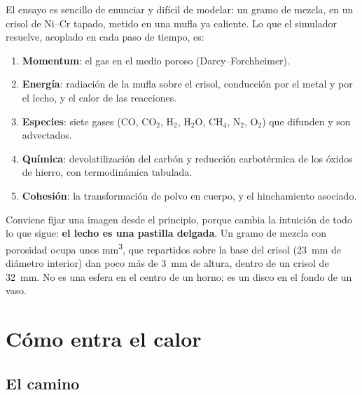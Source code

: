 \documentclass[11pt,a4paper]{article}
\begin{document}
El ensayo es sencillo de enunciar y difícil de modelar: un gramo de mezcla, en
un crisol de Ni--Cr tapado, metido en una mufla ya caliente. Lo que el
simulador resuelve, acoplado en cada paso de tiempo, es:

\begin{enumerate}[nosep,leftmargin=*]
  \item \textbf{Momentum}: el gas en el medio poroso (Darcy--Forchheimer).
  \item \textbf{Energía}: radiación de la mufla sobre el crisol, conducción por
        el metal y por el lecho, y el calor de las reacciones.
  \item \textbf{Especies}: siete gases (CO, CO$_2$, H$_2$, H$_2$O, CH$_4$,
        N$_2$, O$_2$) que difunden y son advectados.
  \item \textbf{Química}: devolatilización del carbón y reducción carbotérmica
        de los óxidos de hierro, con termodinámica tabulada.
  \item \textbf{Cohesión}: la transformación de polvo en cuerpo, y el
        hinchamiento asociado.
\end{enumerate}

\begin{table}[H]\centering\small
\caption{Parámetros de la corrida. La geometría y la carga son las del ensayo;
el resto son los valores del caso \texttt{carbon\_magnetita.yaml}.}

\end{table}

\noindent
Conviene fijar una imagen desde el principio, porque cambia la intuición de
todo lo que sigue: \textbf{el lecho es una pastilla delgada}. Un gramo de mezcla
con porosidad \datEpsInicial{} ocupa unos
\datVolumenLecho{} \si{\cubic\milli\meter}, que repartidos sobre la base del
crisol
(\SI{23}{\milli\meter} de diámetro interior) dan poco más de
\SI{3}{\milli\meter} de altura, dentro de un crisol de \SI{32}{\milli\meter}. No
es una esfera en el centro de un horno: es un disco en el fondo de un vaso.

\section{Cómo entra el calor}

\subsection{El camino}
\end{document}
